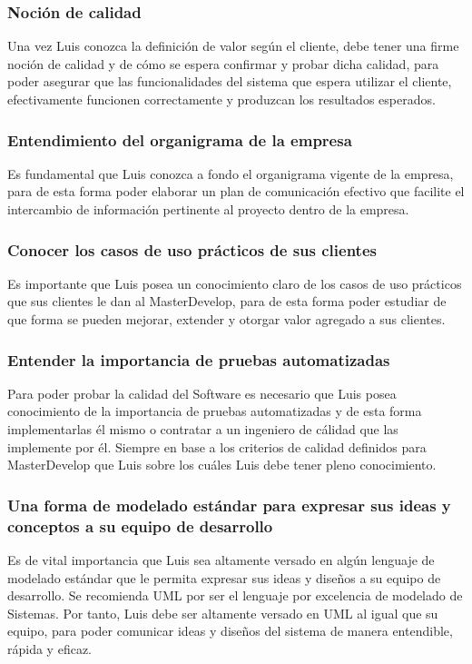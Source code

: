 \documentclass{article}
\begin{document}
    \subsubsection{Noción de calidad}
    	Una vez Luis conozca la definición de valor según el cliente,
	debe tener una firme noción de calidad y de cómo se espera 
	confirmar y probar dicha calidad, para poder asegurar
	que las funcionalidades del sistema que espera utilizar el 
	cliente, efectivamente funcionen correctamente y produzcan 
	los resultados esperados.
    \subsubsection{Entendimiento del organigrama de la empresa}
    	Es fundamental que Luis conozca a fondo el organigrama 
	vigente de la empresa, para de esta forma poder elaborar un 
	plan de comunicación efectivo que facilite el intercambio
	de información pertinente al proyecto dentro de la empresa.
    \subsubsection{Conocer los casos de uso prácticos de sus clientes}
    	Es importante que Luis posea un conocimiento claro de los
	casos de uso prácticos que sus clientes le dan al 
	MasterDevelop, para de esta forma poder estudiar de que forma
	se pueden mejorar, extender y otorgar valor agregado a sus
	clientes.
    \subsubsection{Entender la importancia de pruebas automatizadas}
    	Para poder probar la calidad del Software es necesario que
	Luis posea conocimiento de la importancia de pruebas 
	automatizadas y de esta forma implementarlas él mismo o 
	contratar a un ingeniero de cálidad que las implemente por él.
	Siempre en base a los criterios de calidad definidos para
	MasterDevelop que Luis sobre los cuáles Luis debe
	tener pleno conocimiento.
    \subsubsection{Una forma de modelado estándar para expresar
    sus ideas y conceptos a su equipo de desarrollo}
    	Es de vital importancia que Luis sea altamente versado en 
	algún lenguaje de modelado estándar que le permita
	expresar sus ideas y diseños a su equipo de desarrollo.
	Se recomienda UML por ser el lenguaje por excelencia de 
	modelado de Sistemas. Por tanto, Luis debe ser altamente
	versado en UML al igual que su equipo, para poder comunicar
	ideas y diseños del sistema de manera entendible, rápida
	y eficaz.
\end{document}
